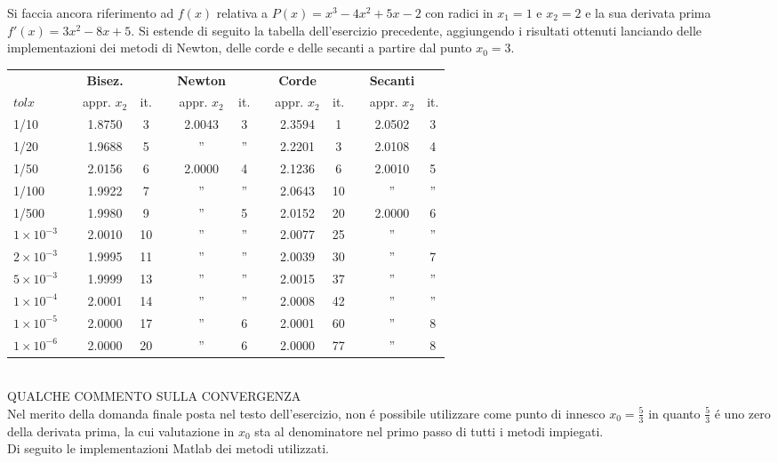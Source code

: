 Si faccia ancora riferimento ad \(f(x)\) relativa a \(P(x)=x^3 - 4x^2 + 5x - 2\) con radici in \(x_1=1\) e \(x_2=2\) e la sua derivata prima \(f'(x) = 3x^2 - 8x + 5\). Si estende di seguito la tabella dell'esercizio precedente, aggiungendo i risultati ottenuti lanciando delle implementazioni dei metodi di Newton, delle corde e delle secanti a partire dal punto \(x_0 = 3\).

\begin{tabular}{l*{12}{c}}
 & \vline& \textbf{Bisez.} & & \vline& \textbf{Newton} & & \vline& \textbf{Corde} & & \vline& \textbf{Secanti} \\
 \(tolx\) & \vline& appr. \(x_2\) & it. & \vline& appr. \(x_2\) & it.& \vline& appr. \(x_2\) & it.& \vline& appr. \(x_2\) & it.\\
\hline
 1/10 & \vline& 1.8750 & 3 & \vline& 2.0043 & 3 & \vline& 2.3594 & 1 & \vline& 2.0502 & 3\\
 1/20 & \vline& 1.9688 & 5 & \vline& '' & ''& \vline& 2.2201 & 3 & \vline& 2.0108 & 4\\
 1/50 & \vline& 2.0156 & 6 & \vline& 2.0000 & 4 & \vline& 2.1236 & 6 & \vline& 2.0010 & 5\\
 1/100 & \vline& 1.9922 & 7 & \vline& '' &'' & \vline& 2.0643 & 10 & \vline& '' & ''\\
 1/500 & \vline& 1.9980 & 9 & \vline& '' & 5 & \vline& 2.0152 & 20 & \vline& 2.0000 & 6\\
 \(1 \times 10^{-3}\) & \vline& 2.0010 & 10 & \vline& '' & '' & \vline& 2.0077 & 25 & \vline& '' & ''\\
 \(2 \times 10^{-3}\) & \vline& 1.9995 & 11 & \vline& '' & '' & \vline& 2.0039 & 30 & \vline& '' & 7\\
 \(5 \times 10^{-3}\) & \vline& 1.9999 & 13 & \vline& '' & '' & \vline& 2.0015 & 37 & \vline& '' & ''\\
 \(1 \times 10^{-4}\) & \vline& 2.0001 & 14 & \vline& '' & '' & \vline& 2.0008 & 42 & \vline& '' & ''\\
 \(1 \times 10^{-5}\) & \vline& 2.0000 & 17 & \vline& '' & 6  & \vline& 2.0001 & 60 & \vline& '' & 8\\
 \(1 \times 10^{-6}\) & \vline& 2.0000 & 20 & \vline& '' & 6  & \vline& 2.0000 & 77 & \vline& '' & 8\\
\end{tabular} \\

\noindent QUALCHE COMMENTO SULLA CONVERGENZA\\

\noindent Nel merito della domanda finale posta nel testo dell'esercizio, non \'e possibile utilizzare come punto di innesco \(x_0=\frac{5}{3}\) in quanto \(\frac{5}{3}\) \'e uno zero della derivata prima, la cui valutazione in \(x_0\) sta al denominatore nel primo passo di tutti i metodi impiegati.\\

\noindent Di seguito le implementazioni Matlab dei metodi utilizzati.


